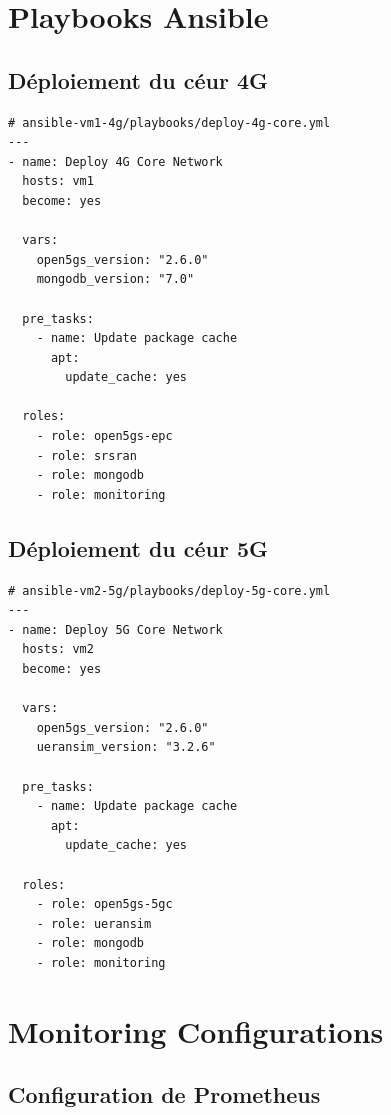 \documentclass[12pt,a4paper]{report}
\begin{document}
\section{Playbooks Ansible}

\subsection{Déploiement du céur 4G}

\begin{lstlisting}[caption=Playbook Ansible - Déploiement 4G]
# ansible-vm1-4g/playbooks/deploy-4g-core.yml
---
- name: Deploy 4G Core Network
  hosts: vm1
  become: yes
  
  vars:
    open5gs_version: "2.6.0"
    mongodb_version: "7.0"
    
  pre_tasks:
    - name: Update package cache
      apt:
        update_cache: yes
        
  roles:
    - role: open5gs-epc
    - role: srsran
    - role: mongodb
    - role: monitoring
\end{lstlisting}

\subsection{Déploiement du céur 5G}

\begin{lstlisting}[caption=Playbook Ansible - Déploiement 5G]
# ansible-vm2-5g/playbooks/deploy-5g-core.yml
---
- name: Deploy 5G Core Network
  hosts: vm2
  become: yes
  
  vars:
    open5gs_version: "2.6.0"
    ueransim_version: "3.2.6"
    
  pre_tasks:
    - name: Update package cache
      apt:
        update_cache: yes
        
  roles:
    - role: open5gs-5gc
    - role: ueransim
    - role: mongodb
    - role: monitoring
\end{lstlisting}

\section{Monitoring Configurations}

\subsection{Configuration de Prometheus}
\end{document}
